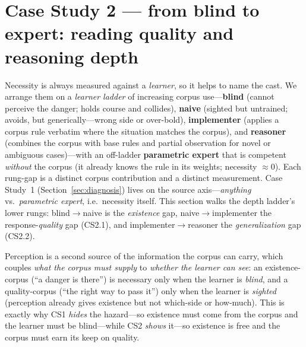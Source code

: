 \documentclass{article}
\begin{document}
\section{Case Study 2 --- from blind to expert: reading quality and reasoning depth}
\label{sec:depth}
Necessity is always measured against a \emph{learner}, so it helps to name the cast. We arrange them
on a \emph{learner ladder} of increasing corpus use---\textbf{blind} (cannot perceive the danger;
holds course and collides), \textbf{naive} (sighted but untrained; avoids, but generically---wrong
side or over-bold), \textbf{implementer} (applies a corpus rule verbatim where the situation matches
the corpus), and \textbf{reasoner} (combines the corpus with base rules and partial observation for
novel or ambiguous cases)---with an off-ladder \textbf{parametric expert} that is competent
\emph{without} the corpus (it already knows the rule in its weights; necessity $\approx 0$). Each
rung-gap is a distinct corpus contribution and a distinct measurement. Case Study~1
(Section~\ref{sec:diagnosis}) lives on the source axis---\emph{anything} vs.\ \emph{parametric
expert}, i.e.\ necessity itself. This section walks the depth ladder's lower rungs: blind$\to$naive is
the \emph{existence} gap, naive$\to$implementer the response-\emph{quality} gap (CS2.1), and
implementer$\to$reasoner the \emph{generalization} gap (CS2.2).

Perception is a second source of the information the corpus can carry, which couples \emph{what the
corpus must supply} to \emph{whether the learner can see}: an existence-corpus (``a danger is there'')
is necessary only when the learner is \emph{blind}, and a quality-corpus (``the right way to pass it'')
only when the learner is \emph{sighted} (perception already gives existence but not which-side or
how-much). This is exactly why CS1 \emph{hides} the hazard---so existence must come from the corpus and
the learner must be blind---while CS2 \emph{shows} it---so existence is free and the corpus must earn
its keep on quality.
\end{document}
